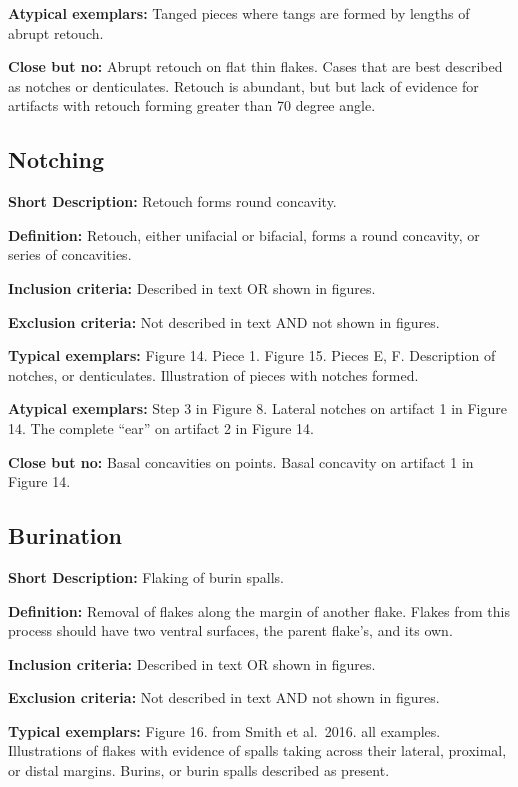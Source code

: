 \documentclass[
]{article}
\begin{document}
\textbf{Atypical exemplars:} Tanged pieces where tangs are formed by
lengths of abrupt retouch.

\textbf{Close but no:} Abrupt retouch on flat thin flakes. Cases that
are best described as notches or denticulates. Retouch is abundant, but
but lack of evidence for artifacts with retouch forming greater than 70
degree angle.

\hypertarget{notching}{%
\subsection{Notching}\label{notching}}

\textbf{Short Description:} Retouch forms round concavity.

\textbf{Definition:} Retouch, either unifacial or bifacial, forms a
round concavity, or series of concavities.

\textbf{Inclusion criteria:} Described in text OR shown in figures.

\textbf{Exclusion criteria:} Not described in text AND not shown in
figures.

\textbf{Typical exemplars:} Figure 14. Piece 1. Figure 15. Pieces E, F.
Description of notches, or denticulates. Illustration of pieces with
notches formed.

\textbf{Atypical exemplars:} Step 3 in Figure 8. Lateral notches on
artifact 1 in Figure 14. The complete ``ear'' on artifact 2 in Figure
14.

\textbf{Close but no:} Basal concavities on points. Basal concavity on
artifact 1 in Figure 14.

\hypertarget{burination}{%
\subsection{Burination}\label{burination}}

\textbf{Short Description:} Flaking of burin spalls.

\textbf{Definition:} Removal of flakes along the margin of another
flake. Flakes from this process should have two ventral surfaces, the
parent flake's, and its own.

\textbf{Inclusion criteria:} Described in text OR shown in figures.

\textbf{Exclusion criteria:} Not described in text AND not shown in
figures.

\textbf{Typical exemplars:} Figure 16. from Smith et al.~2016. all
examples. Illustrations of flakes with evidence of spalls taking across
their lateral, proximal, or distal margins. Burins, or burin spalls
described as present.
\end{document}
